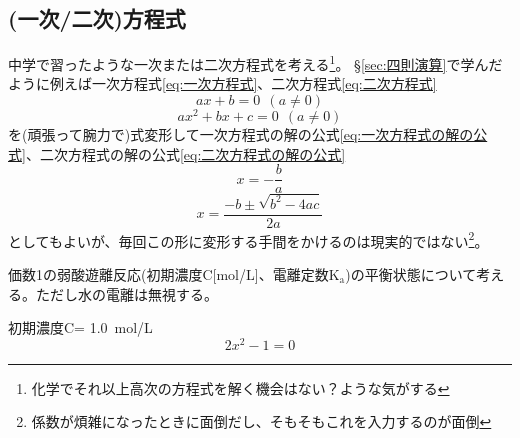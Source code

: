 \documentclass[dvipdfmx, leqno]{jsreport}
\begin{document}
\subsection{(一次/二次)方程式}%
    中学で習ったような一次または二次方程式を考える\footnote{化学でそれ以上高次の方程式を解く機会はない？ような気がする}。
    \S\ref{sec:四則演算}で学んだように例えば一次方程式\eqref{eq:一次方程式}、二次方程式\eqref{eq:二次方程式}
\begin{equation}\label{eq:一次方程式}
    ax+ b= 0\ \ (a\ne 0)
\end{equation}
\begin{equation}\label{eq:二次方程式}
    ax^2+ bx+ c= 0\ \ (a\ne 0)
\end{equation}
    を(頑張って腕力で)式変形して一次方程式の解の公式\eqref{eq:一次方程式の解の公式}、二次方程式の解の公式\eqref{eq:二次方程式の解の公式}
\begin{equation}\label{eq:一次方程式の解の公式}
    x= -\frac{b}{a}
\end{equation}
\begin{equation}\label{eq:二次方程式の解の公式}
    x= \frac{-b\pm \sqrt{b^2- 4ac}}{2a}
\end{equation}
    としてもよいが、毎回この形に変形する手間をかけるのは現実的ではない\footnote{係数が煩雑になったときに面倒だし、そもそもこれを入力するのが面倒}。

\begin{tcolorbox}
    価数1の弱酸遊離反応(初期濃度C[mol/L]、電離定数$\mathrm{K_a}$)の平衡状態について考える。ただし水の電離は無視する。




    初期濃度C= \SI{1.0}{\mole/L}
    \begin{equation}\label{eq:例題・二次方程式}
    2x^2- 1= 0
\end{equation}
\end{tcolorbox}
\end{document}
